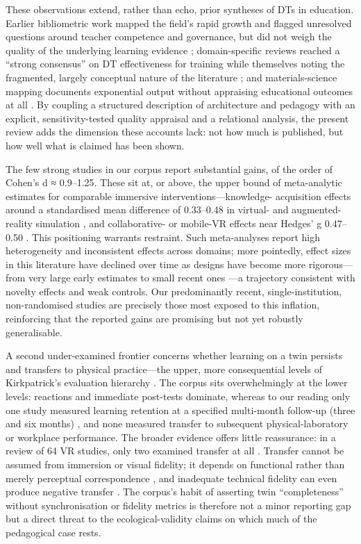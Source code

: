 These observations extend, rather than echo, prior syntheses of DTs in education.
Earlier bibliometric work mapped the field's rapid growth and flagged unresolved
questions around teacher competence and governance, but did not weigh the quality
of the underlying learning evidence \citep{chamorro-atalaya_use_2024};
domain-specific reviews reached a ``strong consensus'' on DT effectiveness for
training while themselves noting the fragmented, largely conceptual nature of the
literature \citep{omrany_digital_2026}; and materials-science mapping documents
exponential output without appraising educational outcomes at all
\citep{vergara_decade_2025}. By coupling a structured description of architecture and
pedagogy with an explicit, sensitivity-tested quality appraisal and a relational
analysis, the present review adds the dimension these accounts lack: not how much
is published, but how well what is claimed has been shown.

The few strong studies in our corpus report substantial gains, of the order of
Cohen's d ≈ 0.9--1.25. These sit at, or above, the upper bound of
meta-analytic estimates for comparable immersive interventions---knowledge-
acquisition effects around a standardised mean difference of 0.33--0.48 in
virtual- and augmented-reality simulation \citep{li_effects_2026, almekkawi_effectiveness_2026}, and collaborative- or mobile-VR effects near Hedges'
g 0.47--0.50 \citep{chen_effects_2026, widowati_meta-analysis_2025}. This positioning warrants
restraint. Such meta-analyses report high heterogeneity and inconsistent effects
across domains; more pointedly, effect sizes in this literature have declined
over time as designs have become
more rigorous---from very large early estimates to small recent ones
\citep{widowati_meta-analysis_2025}---a trajectory consistent with novelty effects and weak
controls. Our predominantly recent, single-institution, non-randomised studies
are precisely those most exposed to this inflation, reinforcing that the reported
gains are promising but not yet robustly generalisable.

A second under-examined frontier concerns whether learning on a twin persists and
transfers to physical practice---the upper, more consequential levels of
Kirkpatrick's evaluation hierarchy \citep{kirkpatrick_kirkpatricks_2016}. The corpus
sits overwhelmingly at the lower levels: reactions and immediate post-tests
dominate, whereas to our reading only one study measured learning retention at a
specified multi-month follow-up (three and six months) \citep{lin_visfactory_2025}, and
none measured transfer to subsequent physical-laboratory or workplace performance.
The broader evidence offers little reassurance: in a review of 64 VR studies, only
two examined transfer at all \citep{zhong_virtual_2026}. Transfer cannot be assumed from immersion or visual
fidelity; it depends on functional rather than merely perceptual correspondence
\citep{harris_framework_2020}, and inadequate technical fidelity can even produce
negative transfer \citep{kim_effect_2026}. The corpus's habit of asserting twin
``completeness'' without synchronisation or fidelity metrics is therefore not a
minor reporting gap but a direct threat to the ecological-validity claims on which
much of the pedagogical case rests.

